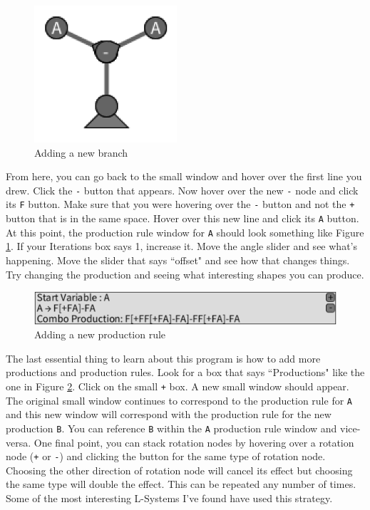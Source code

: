 \documentclass[12pt,twoside]{reedthesis}
\newcommand{\code}[1]{\texttt{#1}}
\begin{document}
	\begin{figure}[h]
	\centering
	\includegraphics[height = 2in]{Images/HowToExplore3}
	\caption{Adding a new branch}
	\label{branching}
	\end{figure}
	
	From here, you can go back to the small window and hover over the first line you drew. Click the \code{-} button that appears. Now hover over the new \code{-} node and click its \code{F} button. Make sure that you were hovering over the \code{-} button and not the \code{+} button that is in the same space. Hover over this new line and click its \code{A} button. At this point, the production rule window for \code{A} should look something like Figure \ref{branching}. If your Iterations box says 1, increase it. Move the angle slider and see what's happening. Move the slider that says ``offset" and see how that changes things. Try changing the production and seeing what interesting shapes you can produce.\\
	
	\begin{figure}[h]
	\centering
	\includegraphics[scale=0.6]{Images/HowToExplore4}
	\caption{Adding a new production rule}
	\label{newProductions}
	\end{figure}
	
	The last essential thing to learn about this program is how to add more productions and production rules. Look for a box that says ``Productions" like the one in Figure \ref{newProductions}. Click on the small \code{+} box. A new small window should appear. The original small window continues to correspond to the production rule for \code{A} and this new window will correspond with the production rule for the new production \code{B}. You can reference \code{B} within the \code{A} production rule window and vice-versa. One final point, you can stack rotation nodes by hovering over a rotation node (\code{+} or \code{-}) and clicking the button for the same type of rotation node. Choosing the other direction of rotation node will cancel its effect but choosing the same type will double the effect. This can be repeated any number of times. Some of the most interesting L-Systems I've found have used this strategy.
	
\end{document}
